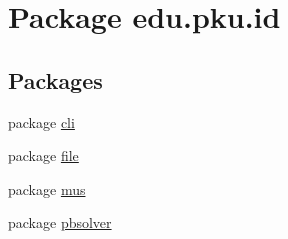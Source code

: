 \hypertarget{namespaceedu_1_1pku_1_1id}{
\section{Package edu.pku.id}
\label{namespaceedu_1_1pku_1_1id}
}
\subsection*{Packages}
\begin{DoxyCompactItemize}
\item 
package \hyperlink{namespaceedu_1_1pku_1_1id_1_1cli}{cli}
\item 
package \hyperlink{namespaceedu_1_1pku_1_1id_1_1file}{file}
\item 
package \hyperlink{namespaceedu_1_1pku_1_1id_1_1mus}{mus}
\item 
package \hyperlink{namespaceedu_1_1pku_1_1id_1_1pbsolver}{pbsolver}
\end{DoxyCompactItemize}
